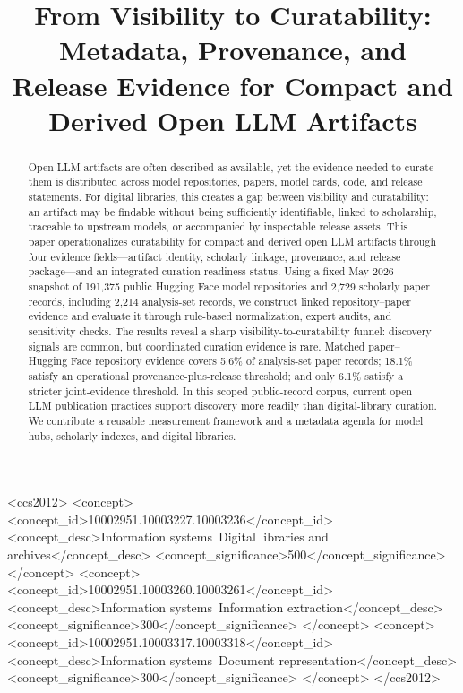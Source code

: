 \documentclass[sigconf,anonymous]{acmart}
\newcommand{\curatability}{curatability\xspace}
\newcommand{\hf}{Hugging Face\xspace}
\newcommand{\llm}{LLM\xspace}
\begin{document}
\title{From Visibility to Curatability: Metadata, Provenance, and Release Evidence for Compact and Derived Open LLM Artifacts}

\begin{abstract}
Open \llm artifacts are often described as available, yet the evidence needed to curate them is distributed across model repositories, papers, model cards, code, and release statements. For digital libraries, this creates a gap between visibility and \curatability: an artifact may be findable without being sufficiently identifiable, linked to scholarship, traceable to upstream models, or accompanied by inspectable release assets. This paper operationalizes \curatability for compact and derived open \llm artifacts through four evidence fields---artifact identity, scholarly linkage, provenance, and release package---and an integrated curation-readiness status. Using a fixed May 2026 snapshot of 191,375 public \hf model repositories and 2,729 scholarly paper records, including 2,214 analysis-set records, we construct linked repository--paper evidence and evaluate it through rule-based normalization, expert audits, and sensitivity checks. The results reveal a sharp visibility-to-curatability funnel: discovery signals are common, but coordinated curation evidence is rare. Matched paper--\hf repository evidence covers 5.6\% of analysis-set paper records; 18.1\% satisfy an operational provenance-plus-release threshold; and only 6.1\% satisfy a stricter joint-evidence threshold. In this scoped public-record corpus, current open \llm publication practices support discovery more readily than digital-library curation. We contribute a reusable measurement framework and a metadata agenda for model hubs, scholarly indexes, and digital libraries.
\end{abstract}

\begin{CCSXML}
<ccs2012>
   <concept>
       <concept_id>10002951.10003227.10003236</concept_id>
       <concept_desc>Information systems~Digital libraries and archives</concept_desc>
       <concept_significance>500</concept_significance>
       </concept>
   <concept>
       <concept_id>10002951.10003260.10003261</concept_id>
       <concept_desc>Information systems~Information extraction</concept_desc>
       <concept_significance>300</concept_significance>
       </concept>
   <concept>
       <concept_id>10002951.10003317.10003318</concept_id>
       <concept_desc>Information systems~Document representation</concept_desc>
       <concept_significance>300</concept_significance>
       </concept>
 </ccs2012>
\end{CCSXML}
\end{document}
